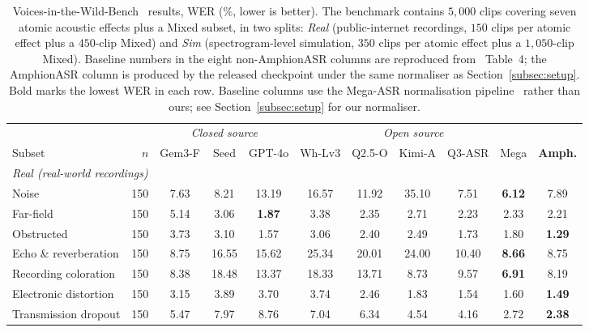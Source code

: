 \begin{table}[t]
  \caption{Voices-in-the-Wild-Bench~\cite{xie2026mega} results, WER
    (\%, lower is better). The benchmark contains $5{,}000$ clips
    covering seven atomic acoustic effects plus a Mixed subset, in
    two splits: \emph{Real} (public-internet recordings, $150$ clips
    per atomic effect plus a $450$-clip Mixed) and \emph{Sim}
    (spectrogram-level simulation, $350$ clips per atomic effect plus
    a $1{,}050$-clip Mixed). Baseline numbers in the eight
    non-AmphionASR columns are reproduced from~\cite{xie2026mega}
    Table~4; the AmphionASR column is produced by the released
    checkpoint under the same normaliser as
    Section~\ref{subsec:setup}. Bold marks the lowest WER in each row.
    Baseline columns use the Mega-ASR normalisation pipeline~\cite{xie2026mega}
    rather than ours; see Section~\ref{subsec:setup} for our normaliser.}
  \label{tab:vitw_bench}
  \centering
  \scriptsize
  \setlength{\tabcolsep}{3pt}
  \begin{tabular}{l@{\hspace{3pt}}rccccccccc}
    \toprule
    & & \multicolumn{3}{c}{\emph{Closed source}} & \multicolumn{5}{c}{\emph{Open source}} & \\
    \cmidrule(lr){3-5} \cmidrule(lr){6-10}
    Subset & $n$ & Gem3-F & Seed & GPT-4o & Wh-Lv3 & Q2.5-O & Kimi-A & Q3-ASR & Mega & \textbf{Amph.} \\
    \midrule
    \multicolumn{11}{l}{\emph{Real (real-world recordings)}} \\
    \midrule
    Noise                  & 150  & 7.63  & 8.21  & 13.19 & 16.57 & 11.92 & 35.10 & 7.51  & \textbf{6.12} & 7.89 \\
    Far-field              & 150  & 5.14  & 3.06  & \textbf{1.87} & 3.38  & 2.35  & 2.71  & 2.23  & 2.33  & 2.21 \\
    Obstructed             & 150  & 3.73  & 3.10  & 1.57  & 3.06  & 2.40  & 2.49  & 1.73  & 1.80  & \textbf{1.29} \\
    Echo \& reverberation  & 150  & 8.75  & 16.55 & 15.62 & 25.34 & 20.01 & 24.00 & 10.40 & \textbf{8.66} & 8.75 \\
    Recording coloration   & 150  & 8.38  & 18.48 & 13.37 & 18.33 & 13.71 & 8.73  & 9.57  & \textbf{6.91} & 8.19 \\
    Electronic distortion  & 150  & 3.15  & 3.89  & 3.70  & 3.74  & 2.46  & 1.83  & 1.54  & 1.60  & \textbf{1.49} \\
    Transmission dropout   & 150  & 5.47  & 7.97  & 8.76  & 7.04  & 6.34  & 4.54  & 4.16  & 2.72  & \textbf{2.38} \\

\end{tabular}
\end{table}

